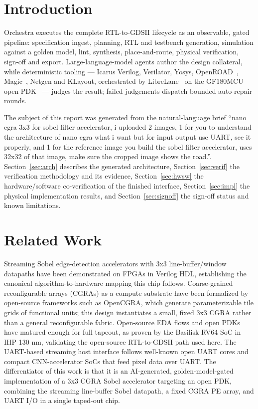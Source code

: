 \documentclass{ieeeaccess}
\begin{document}
\titlepgskip=-15pt

\maketitle

\section{Introduction}
\label{sec:introduction}
 Orchestra executes the complete RTL-to-GDSII lifecycle as an observable, gated pipeline: specification ingest, planning, RTL and testbench generation, simulation against a golden model, lint, synthesis, place-and-route, physical verification, sign-off and export. Large-language-model agents author the design collateral, while deterministic tooling --- Icarus Verilog, Verilator, Yosys, OpenROAD~\cite{b1}, Magic~\cite{b2}, Netgen and KLayout, orchestrated by LibreLane~\cite{b3} on the GF180MCU open PDK~\cite{b4} --- judges the result; failed judgements dispatch bounded auto-repair rounds.

The subject of this report was generated from the natural-language brief ``nano cgra 3x3 for sobel filter accelerator, i uploaded 2 images, 1 for you to understand the architecture of nano cgra what i want but for input output use UART, see it properly, and 1 for the reference image you build the sobel filter accelerator, uses 32x32 of that image, make sure the cropped image shows the road.''. Section~\ref{sec:arch} describes the generated architecture, Section~\ref{sec:verif} the verification methodology and its evidence, Section~\ref{sec:hwsw} the hardware/software co-verification of the finished interface, Section~\ref{sec:impl} the physical implementation results, and Section~\ref{sec:signoff} the sign-off status and known limitations.

\section{Related Work}
\label{sec:related}
Streaming Sobel edge-detection accelerators with 3x3 line-buffer/window datapaths have been demonstrated on FPGAs in Verilog HDL, establishing the canonical algorithm-to-hardware mapping this chip follows. Coarse-grained reconfigurable arrays (CGRAs) as a compute substrate have been formalized by open-source frameworks such as OpenCGRA, which generate parameterizable tile grids of functional units; this design instantiates a small, fixed 3x3 CGRA rather than a general reconfigurable fabric. Open-source EDA flows and open PDKs have matured enough for full tapeout, as proven by the Basilisk RV64 SoC in IHP 130 nm, validating the open-source RTL-to-GDSII path used here. The UART-based streaming host interface follows well-known open UART cores and compact CNN-accelerator SoCs that feed pixel data over UART. The differentiator of this work is that it is an AI-generated, golden-model-gated implementation of a 3x3 CGRA Sobel accelerator targeting an open PDK, combining the streaming line-buffer Sobel datapath, a fixed CGRA PE array, and UART I/O in a single taped-out chip.
\end{document}
